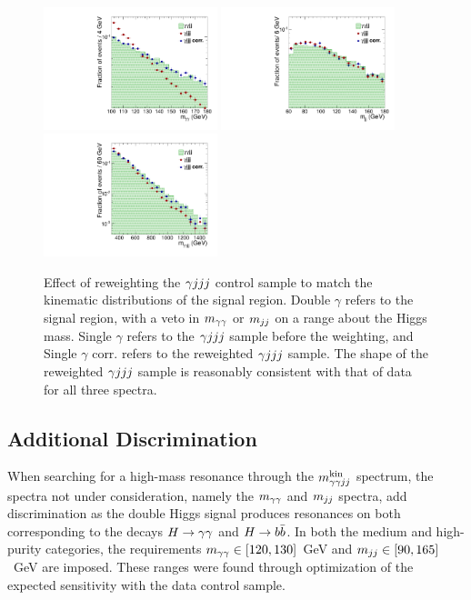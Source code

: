 \begin{figure}[ht]
 \begin{center}
   \includegraphics[width=0.45\textwidth]{figures/selection/mggSpectrum-log.pdf}
   \includegraphics[width=0.45\textwidth]{figures/selection/mjjSpectrum-log.pdf}
   \includegraphics[width=0.45\textwidth]{figures/selection/mradSpectrum-log.pdf}
 \end{center}
\caption{Effect of reweighting the $\gamma jjj$ control sample
to match the kinematic distributions of the
signal region. Double $\gamma$ refers to the signal region, with a veto in $m_{\gamma\gamma}$ or $m_{jj}$
on a range about the Higgs mass. Single $\gamma$
refers to the $\gamma jjj$ sample before the weighting, and Single $\gamma$ corr. refers to the reweighted
$\gamma jjj$ sample. The shape of the reweighted $\gamma jjj$ sample is reasonably consistent with that of data
for all three spectra.}
\label{fig:datacs}
\end{figure}

\subsection{Additional Discrimination\label{subsec:add_discrimination}}

When searching for a high-mass resonance through the $m_{\gamma\gamma jj}^{\rm kin}$ spectrum, the spectra not under
consideration, namely the $m_{\gamma\gamma}$ and $m_{jj}$ spectra, add discrimination as the double Higgs
signal produces resonances on both corresponding to the decays $H\to\gamma\gamma$ and $H\to b\bar{b}$. In both
the medium and high-purity categories,
the requirements $m_{\gamma\gamma} \in [120, 130]$~GeV and $m_{jj} \in [90, 165]$~GeV
are imposed.
These ranges were found through optimization of the expected sensitivity with the data control sample.

